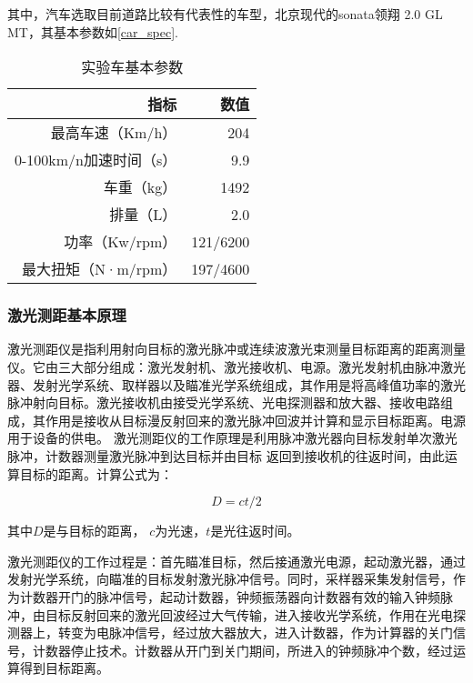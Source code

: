 其中，汽车选取目前道路比较有代表性的车型，北京现代的sonata领翔 2.0 GL MT，其基本参数如\autoref{car_spec}.


\begin{table}[htbp]
  \centering
  \caption{实验车基本参数}
    \begin{tabular}{rr}
    \addlinespace
    \toprule
	指标&	数值\\
	\midrule
    最高车速（Km/h） & 204 \\
    0-100km/n加速时间（s） & 9.9 \\
    车重（kg）    & 1492 \\
    排量（L） & 2.0  \\
    功率（Kw/rpm） & 121/6200 \\
    最大扭矩（N·m/rpm） & 197/4600 \\
    \bottomrule
    \end{tabular}%
  \label{car_spec}%
\end{table}%


\subsubsection{激光测距基本原理}
激光测距仪是指利用射向目标的激光脉冲或连续波激光束测量目标距离的距离测量仪。它由三大部分组成：激光发射机、激光接收机、电源。激光发射机由脉冲激光器、发射光学系统、取样器以及瞄准光学系统组成，其作用是将高峰值功率的激光脉冲射向目标。激光接收机由接受光学系统、光电探测器和放大器、接收电路组成，其作用是接收从目标漫反射回来的激光脉冲回波并计算和显示目标距离。电源用于设备的供电。
激光测距仪的工作原理是利用脉冲激光器向目标发射单次激光脉冲，计数器测量激光脉冲到达目标并由目标 返回到接收机的往返时间，由此运算目标的距离。计算公式为：

\begin{equation}
D = ct/2
\end{equation}

其中$D$是与目标的距离， $c$为光速，$t$是光往返时间。

激光测距仪的工作过程是：首先瞄准目标，然后接通激光电源，起动激光器，通过发射光学系统，向瞄准的目标发射激光脉冲信号。同时，采样器采集发射信号，作为计数器开门的脉冲信号，起动计数器，钟频振荡器向计数器有效的输入钟频脉冲，由目标反射回来的激光回波经过大气传输，进入接收光学系统，作用在光电探测器上，转变为电脉冲信号，经过放大器放大，进入计数器，作为计算器的关门信号，计数器停止技术。计数器从开门到关门期间，所进入的钟频脉冲个数，经过运算得到目标距离。


